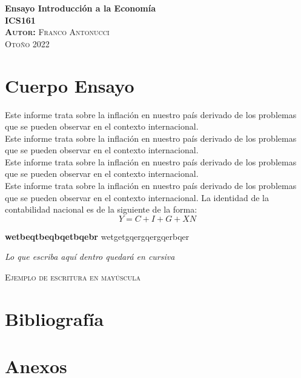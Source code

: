 \documentclass{exam}
\begin{document}
\begin{center}


\LARGE{\textbf{Ensayo Introducción a la Economía}}\\
\LARGE{\textbf{ICS161}}\\
\bigskip
\bigskip
\small{
\noindent \textsc{\textbf{Autor:} Franco Antonucci}}\\
\small{
\noindent 
}
\normalsize{\textsc{Otoño 2022}}
\smallskip
\end{center}



\section*{Cuerpo Ensayo}

Este informe trata sobre la inflación en nuestro país derivado de los problemas que se pueden observar en el contexto internacional.\\

Este informe trata sobre la inflación en nuestro país derivado de los problemas que se pueden observar en el contexto internacional.\\

Este informe trata sobre la inflación en nuestro país derivado de los problemas que se pueden observar en el contexto internacional.\\
Este informe trata sobre la inflación en nuestro país derivado de los problemas que se pueden observar en el contexto internacional. La identidad de la contabilidad nacional es de la siguiente de la forma: $$ Y = C + I + G + XN $$

\textbf{wetbeqtbeqbqetbqebr} wetgetgqergqergqerbqer

\textit{Lo que escriba aquí dentro quedará en cursiva}

\textsc{Ejemplo de escritura en mayúscula}


\newpage
\section*{Bibliografía}


\newpage
\section*{Anexos}
\end{document}
